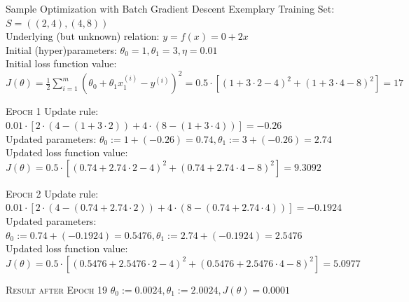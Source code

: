 \documentclass[main.tex]{subfiles}
\begin{document}
    \begin{frame}{Sample Optimization with Batch Gradient Descent}
        Exemplary Training Set: $S = ((2, 4), (4, 8))$ \\
        Underlying (but unknown) relation: $y = f(x) = 0 + 2x$ \\
        Initial (hyper)parameters: $\theta_0=1, \theta_1=3, \eta = 0.01$ \\
        Initial loss function value: $J(\theta) = \frac{1}{2} \sum_{i=1}^m (\theta_0 + \theta_1x_1^{(i)} - y^{(i)})^2 = 0.5 \cdot [(1 + 3 \cdot 2 - 4)^2 + (1 + 3 \cdot 4 - 8)^2] = 17$
        
        \begin{alertblock}{\textsc{Epoch 1}}
            Update rule: $0.01 \cdot [2 \cdot (4 - (1 + 3 \cdot 2)) + 4 \cdot (8 - (1 + 3 \cdot 4))] = -0.26$ \\
            Updated parameters: $\theta_0 := 1 + (-0.26) = 0.74, \theta_1 := 3 + (-0.26) = 2.74$ \\
            Updated loss function value: $J(\theta) = 0.5 \cdot [(0.74 + 2.74 \cdot 2 - 4)^2 + (0.74 + 2.74 \cdot 4 - 8)^2] = 9.3092$
        \end{alertblock}
        
        \begin{alertblock}{\textsc{Epoch 2}}
            Update rule: $0.01 \cdot [2 \cdot (4 - (0.74 + 2.74 \cdot 2)) + 4 \cdot (8 - (0.74 + 2.74 \cdot 4))] = -0.1924$ \\
            Updated parameters: $\theta_0 := 0.74 + (-0.1924) = 0.5476, \theta_1 := 2.74 + (-0.1924) = 2.5476$ \\
            Updated loss function value: $J(\theta) = 0.5 \cdot [(0.5476 + 2.5476 \cdot 2 - 4)^2 + (0.5476 + 2.5476 \cdot 4 - 8)^2] = 5.0977$
        \end{alertblock}
        
        \begin{alertblock}{\textsc{Result after Epoch 19}}
            $\theta_0 := 0.0024, \theta_1 := 2.0024, J(\theta) = 0.0001$ \\
        \end{alertblock}
    \end{frame}
\end{document}
